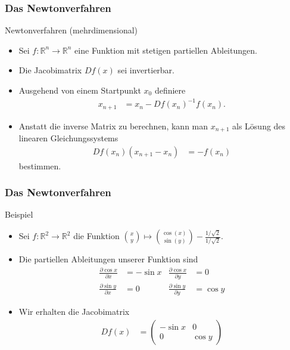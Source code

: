 \documentclass{beamer}
\newcommand\RR{\mathbb R}
\renewcommand{\oe}{\"o}
\newcommand{\mytitle}{Das Newtonverfahren}
\begin{document}
\begin{frame}\frametitle{\mytitle}
	\begin{block}{Newtonverfahren (mehrdimensional)}
		\begin{itemize}
			\item Sei $f:\RR^n\to\RR^n$ eine Funktion mit stetigen partiellen Ableitungen.
			\item Die Jacobimatrix $Df(x)$ sei invertierbar.
			\item Ausgehend von einem Startpunkt $x_0$ definiere
				\begin{align*}
					x_{n+1}&=x_n-Df(x_n)^{-1}f(x_n).
				\end{align*}
			\item Anstatt die inverse Matrix zu berechnen, kann man $x_{n+1}$ als L\oe sung des linearen Gleichungssystems
				\begin{align*}
					Df(x_n)(x_{n+1}-x_n)&=-f(x_n)
				\end{align*}
				bestimmen.
		\end{itemize}
	\end{block}
\end{frame}

\begin{frame}\frametitle{\mytitle}
	\begin{block}{Beispiel}
		\begin{itemize}
			\item Sei $f:\RR^2\to\RR^2$ die Funktion $\binom xy\mapsto\binom{\cos(x)}{\sin(y)}-\frac{1/\sqrt 2}{1/\sqrt 2}$.
			\item Die partiellen Ableitungen unserer Funktion sind
				\begin{align*}
					\frac{\partial\cos x}{\partial x}&=-\sin x&\frac{\partial\cos x}{\partial y}&=0\\
					\frac{\partial\sin y}{\partial x}&=0&\frac{\partial\sin y}{\partial y}&=\cos y
				\end{align*}
			\item Wir erhalten die Jacobimatrix
				\begin{align*}
					Df(x)&=\begin{pmatrix} -\sin x&0\\0&\cos y \end{pmatrix}
				\end{align*}
		\end{itemize}
	\end{block}
\end{frame}
\end{document}
